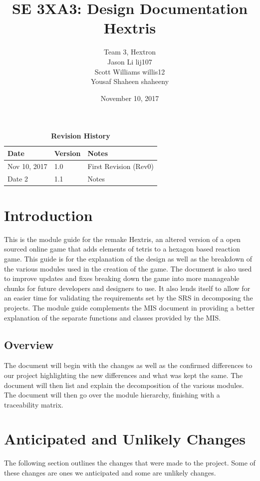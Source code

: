 \documentclass[12pt, titlepage]{article}
\title{SE 3XA3: Design Documentation\\Hextris}
\author{Team 3, Hextron
		\\ Jason Li lij107
		\\ Scott Williams willis12
		\\ Yousaf Shaheen shaheeny
}
\date{November 10, 2017}
\begin{document}
\maketitle

\tableofcontents
\listoftables
\listoffigures


\begin{table}[bp]
\caption{\bf Revision History}
\begin{tabularx}{\textwidth}{p{3cm}p{2cm}X}
\toprule {\bf Date} & {\bf Version} & {\bf Notes}\\
\midrule
Nov 10, 2017 & 1.0 & First Revision (Rev0)\\
Date 2 & 1.1 & Notes\\
\bottomrule
\end{tabularx}
\end{table}

\newpage
{}
\newpage
\section{Introduction}
This is the module guide for the remake Hextris, an altered version of a open sourced online game that adds elements of tetris to a hexagon based reaction game. This guide is for the explanation of the design as well as the breakdown of the various modules used in the creation of the game. The document is also used to improve updates and fixes breaking down the game into more manageable chunks for future developers and designers to use. It also lends itself to allow for an easier time for  validating the requirements set by the SRS in decomposing the projects. The module guide complements the MIS document in providing a better explanation of the separate functions and classes provided by the MIS. 

\subsection{Overview}
The document will begin with the changes as well as the confirmed differences to our project highlighting the new differences and what was kept the same. The document will then list and explain the decomposition of the various modules. The document will then go over the module hierarchy, finishing with a traceability matrix.



\section{Anticipated and Unlikely Changes}
The following section outlines the changes that were made to the project. Some of these changes are ones we anticipated and some are unlikely changes.
\end{document}
